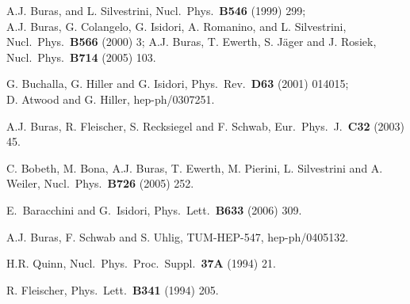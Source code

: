 \documentclass[11pt]{cernrep}
\begin{document}
\begin{thebibliography}{999}
A.J. Buras, and L. Silvestrini,
{ Nucl.\ Phys.}~{\bf B546} (1999) 299;\\
A.J. Buras, G. Colangelo, G. Isidori, A. Romanino, and L. Silvestrini,
{ Nucl.\ Phys.}~{\bf B566} (2000) 3;
A.J. Buras, T. Ewerth, S. J\"ager and J. Rosiek,
{ Nucl.\ Phys.}~{\bf B714} (2005) 103.

G. Buchalla, G. Hiller and G. Isidori,
{ Phys.\ Rev.}~{\bf D63} (2001) 014015;\\
D. Atwood and G. Hiller,
hep-ph/0307251.

A.J. Buras, R. Fleischer, S. Recksiegel and F. Schwab,
{ Eur.\ Phys.\ J.}~{\bf C32} (2003) 45.

C. Bobeth, M. Bona, A.J. Buras, T. Ewerth, M. Pierini, L. Silvestrini and A. Weiler,
  { Nucl.\ Phys.}~{\bf B726} (2005) 252.

E.~Baracchini and G.~Isidori,
  Phys.\ Lett.\  {\bf B633} (2006) 309.

A.J. Buras, F. Schwab and S. Uhlig,
TUM-HEP-547, hep-ph/0405132.

H.R. Quinn,
{ Nucl.\ Phys.\ Proc.\ Suppl.}~{\bf 37A} (1994) 21.

R. Fleischer,
{ Phys.\ Lett.}~{\bf B341} (1994) 205.


\end{thebibliography}
\end{document}
